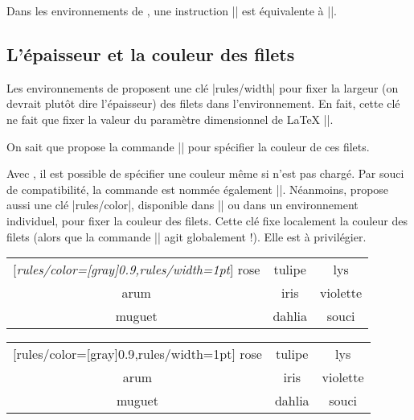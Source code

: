 \documentclass[dvipsnames]{article}%
\begin{document}
\medskip
Dans les environnements de , une instruction
|| est équivalente à
||.

\subsection{L'épaisseur et la couleur des filets}


Les environnements de  proposent une clé |rules/width| pour
fixer la largeur (on devrait plutôt dire l'épaisseur) des filets dans
l'environnement. En fait,  cette clé ne fait que fixer la valeur du paramètre
dimensionnel de LaTeX |\arrayrulewidth|.

\smallskip
On sait que  propose la commande |\arrayrulecolor| pour spécifier
la couleur de ces filets.

\smallskip
{} 
Avec , il est possible de spécifier une couleur même si
 n'est pas chargé. Par souci de compatibilité, la commande est
nommée également |\arrayrulecolor|. Néanmoins,  propose aussi
une clé |rules/color|, disponible dans |\NiceMatrixOptions| ou dans un
environnement individuel, pour fixer la couleur des filets. Cette clé fixe
localement la couleur des filets (alors que la commande |\arrayrulecolor| agit
globalement !). Elle est à privilégier.

\medskip
\begin{Code}[width=15cm]
\begin{NiceTabular}{|ccc|}[\emph{rules/color=[gray]{0.9},rules/width=1pt}]
\hline
rose & tulipe & lys \\
arum & iris & violette \\
muguet & dahlia & souci \\
\hline
\end{NiceTabular}
\end{Code}
\hspace{-5cm}
\begin{NiceTabular}{|ccc|}[rules/color=[gray]{0.9},rules/width=1pt]
\hline
rose & tulipe & lys \\
arum & iris & violette \\
muguet & dahlia & souci \\
\hline
\end{NiceTabular}
\end{document}
